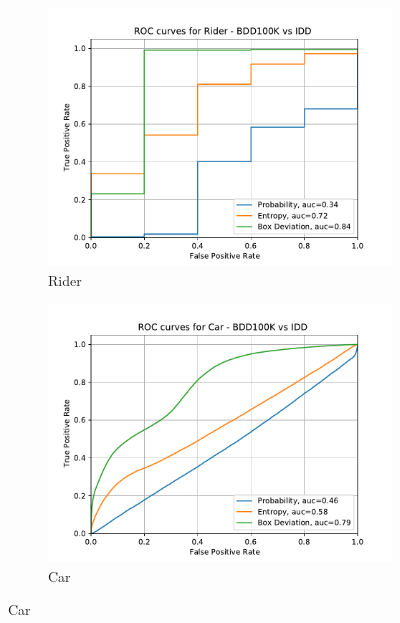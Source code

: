 \begin{figure}[H]
    	\begin{subfigure}[t]{0.495\textwidth}
    		\centering
    		\includegraphics[width=\textwidth]{images/ROC/rider_ROC_bdd_vs_idd_Score_using_subens.pdf}
    		\caption{Rider}
    	\end{subfigure}
    	\begin{subfigure}[t]{0.495\textwidth}
    		\centering
    		\includegraphics[width=\textwidth]{images/ROC/car_ROC_bdd_vs_idd_Score_using_subens.pdf}
    		\caption{Car}
    	\end{subfigure}
    	\end{figure}
        	
